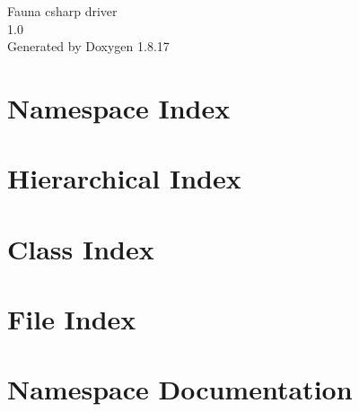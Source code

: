 \let\mypdfximage\pdfximage\def\pdfximage{\immediate\mypdfximage}\documentclass[twoside]{book}
\newcommand{\+}{\discretionary{\mbox{\scriptsize$\hookleftarrow$}}{}{}}
\newcommand{\clearemptydoublepage}{%
  \newpage{\pagestyle{empty}\cleardoublepage}%
}
\begin{document}
\hypersetup{pageanchor=false,
             bookmarksnumbered=true,
             pdfencoding=unicode
            }
\begin{titlepage}
\vspace*{7cm}
\begin{center}%
{\Large Fauna csharp driver \\[1ex]\large 1.\+0 }\\
\vspace*{1cm}
{\large Generated by Doxygen 1.8.17}\\
\end{center}
\end{titlepage}
\clearemptydoublepage
{}
\tableofcontents
\clearemptydoublepage
{}
\hypersetup{pageanchor=true}

\chapter{Namespace Index}

\chapter{Hierarchical Index}

\chapter{Class Index}

\chapter{File Index}

\chapter{Namespace Documentation}








\end{document}
